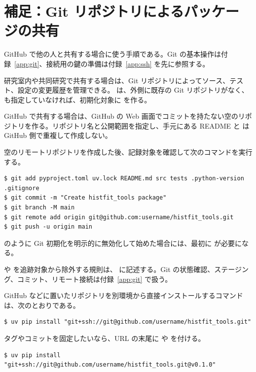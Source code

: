 \section{補足：Git リポジトリによるパッケージの共有}

GitHub で他の人と共有する場合に使う手順である。Git の基本操作は付録~\ref{app:git}、接続用の鍵の準備は付録~\ref{app:ssh} を先に参照する。

研究室内や共同研究で共有する場合は、Git リポジトリによってソース、テスト、設定の変更履歴を管理できる。 は、外側に既存の Git リポジトリがなく、 も指定していなければ、初期化対象に  を作る。

GitHub で共有する場合は、GitHub の Web 画面でコミットを持たない空のリポジトリを作る。リポジトリ名と公開範囲を指定し、手元にある README と  は GitHub 側で重複して作成しない。

空のリモートリポジトリを作成した後、記録対象を確認して次のコマンドを実行する。

\begin{lstlisting}[numbers=none, xleftmargin=2\zw]
$ git add pyproject.toml uv.lock README.md src tests .python-version .gitignore
$ git commit -m "Create histfit_tools package"
$ git branch -M main
$ git remote add origin git@github.com:username/histfit_tools.git
$ git push -u origin main
\end{lstlisting}

 のように Git 初期化を明示的に無効化して始めた場合には、最初に  が必要になる。

 や  を追跡対象から除外する規則は、 に記述する。Git の状態確認、ステージング、コミット、リモート接続は付録~\ref{app:git} で扱う。

GitHub などに置いたリポジトリを別環境から直接インストールするコマンドは、次のとおりである。

\begin{lstlisting}[numbers=none, xleftmargin=2\zw]
$ uv pip install "git+ssh://git@github.com/username/histfit_tools.git"
\end{lstlisting}

タグやコミットを固定したいなら、URL の末尾に  や  を付ける。

\begin{lstlisting}[numbers=none, xleftmargin=2\zw]
$ uv pip install "git+ssh://git@github.com/username/histfit_tools.git@v0.1.0"
\end{lstlisting}

